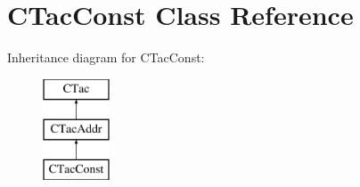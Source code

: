 \hypertarget{classCTacConst}{\section{C\-Tac\-Const Class Reference}
\label{classCTacConst}
}
Inheritance diagram for C\-Tac\-Const\-:\begin{figure}[H]
\begin{center}
\leavevmode
\includegraphics[height=3.000000cm]{classCTacConst}
\end{center}
\end{figure}
